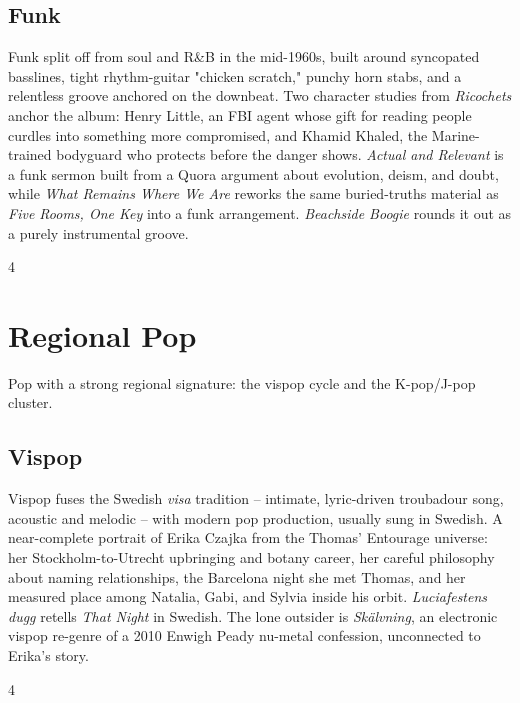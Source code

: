 \documentclass[a4paper,landscape]{memoir}
\begin{document}
\chapter{Funk}
Funk split off from soul and R\&B in the mid-1960s, built around syncopated basslines, tight rhythm-guitar "chicken scratch," punchy horn stabs, and a relentless groove anchored on the downbeat. Two character studies from \emph{Ricochets} anchor the album: Henry Little, an FBI agent whose gift for reading people curdles into something more compromised, and Khamid Khaled, the Marine-trained bodyguard who protects before the danger shows. \emph{Actual and Relevant} is a funk sermon built from a Quora argument about evolution, deism, and doubt, while \emph{What Remains Where We Are} reworks the same buried-truths material as \emph{Five Rooms, One Key} into a funk arrangement. \emph{Beachside Boogie} rounds it out as a purely instrumental groove.
\clearpage\begin{multicols*}{4}
\end{multicols*}

\part{Regional Pop}
Pop with a strong regional signature: the vispop cycle and the K-pop/J-pop cluster.

\chapter{Vispop}
Vispop fuses the Swedish \emph{visa} tradition -- intimate, lyric-driven troubadour song, acoustic and melodic -- with modern pop production, usually sung in Swedish. A near-complete portrait of Erika Czajka from the Thomas' Entourage universe: her Stockholm-to-Utrecht upbringing and botany career, her careful philosophy about naming relationships, the Barcelona night she met Thomas, and her measured place among Natalia, Gabi, and Sylvia inside his orbit. \emph{Luciafestens dugg} retells \emph{That Night} in Swedish. The lone outsider is \emph{Skälvning}, an electronic vispop re-genre of a 2010 Enwigh Peady nu-metal confession, unconnected to Erika's story.
\clearpage\begin{multicols*}{4}
\end{multicols*}
\end{document}
